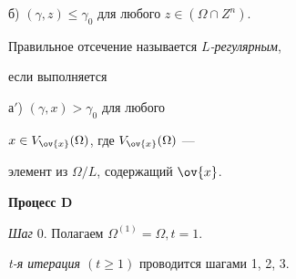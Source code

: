 б) $(\gamma,z) \leq \gamma_{0}$ для любого $z \in (\Omega \cap Z^{n})$.





\noindent{}Правильное отсечение называется { \it $L$-регулярным}, 


если выполняется





а${}'$) $( \gamma,x) > \gamma_{0}$ для любого


$x \in V_{ \ov{x}}( \Omega)$, где $V_{ \ov{x}}( \Omega)$ ---


элемент из $ \Omega/L$, содержащий $ \ov{x}$.


\medskip





                                               


{ \bf Процесс D}


\medskip








{\it Шаг} 0. Полагаем $ \Omega^{(1)} = \Omega, t=1$.


\medskip





{\it t-я итерация $(t \geq 1)$} проводится шагами 1, 2, 3.


\medskip





